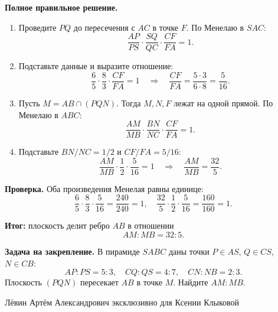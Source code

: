 \documentclass[a4paper,12pt]{article}
\begin{document}
\textbf{Полное правильное решение.}
\begin{enumerate}
\item Проведите $PQ$ до пересечения с $AC$ в точке $F$.
По Менелаю в $SAC$:
\[
\frac{AP}{PS}\cdot\frac{SQ}{QC}\cdot\frac{CF}{FA}=1.
\]
\item Подставьте данные и выразите отношение:
\[
\frac65\cdot\frac83\cdot\frac{CF}{FA}=1
\quad\Longrightarrow\quad
\frac{CF}{FA}=\frac{5\cdot3}{6\cdot8}=\frac5{16}.
\]
\item Пусть $M=AB\cap(PQN)$. Тогда $M,N,F$ лежат на одной прямой.
По Менелаю в $ABC$:
\[
\frac{AM}{MB}\cdot\frac{BN}{NC}\cdot\frac{CF}{FA}=1.
\]
\item Подставьте $BN/NC=1/2$ и $CF/FA=5/16$:
\[
\frac{AM}{MB}\cdot\frac12\cdot\frac5{16}=1
\quad\Longrightarrow\quad
\frac{AM}{MB}=\frac{32}{5}.
\]
\end{enumerate}

\textbf{Проверка.}
Оба произведения Менелая равны единице:
\[
\frac65\cdot\frac83\cdot\frac5{16}=\frac{240}{240}=1,
\quad
\frac{32}{5}\cdot\frac12\cdot\frac5{16}=\frac{160}{160}=1.
\]

\textcolor{teal!60!black}{\textbf{Итог:}}
плоскость делит ребро $AB$ в отношении
\[\boxed{AM:MB=32:5}.\]

\textbf{Задача на закрепление.}
В пирамиде $SABC$ даны точки $P\in AS$, $Q\in CS$, $N\in CB$:
\[
AP:PS=5:3,\quad CQ:QS=4:7,\quad CN:NB=2:3.
\]
Плоскость $(PQN)$ пересекает $AB$ в точке $M$.
Найдите $AM:MB$.

\vfill
\begin{center}
{\small Лёвин Артём Александрович эксклюзивно для Ксении Клыковой}
\end{center}
\end{document}
